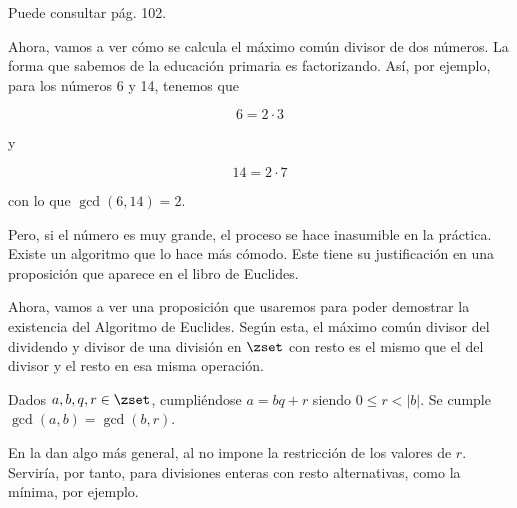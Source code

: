 


Puede consultar \cite{rosen} pág. 102.

Ahora, vamos a ver cómo se calcula el máximo común divisor de dos números.
La forma que sabemos de la educación primaria es factorizando. Así, por
ejemplo, para los números 6 y 14, tenemos que

$$ 6 = 2 \cdot 3 $$

\noindent y

$$ 14 = 2 \cdot 7 $$

\noindent con lo que $\gcd(6, 14) = 2$.

Pero, si el número es muy grande, el proceso se hace inasumible en la
práctica. Existe un algoritmo que lo hace más cómodo. Este tiene su
justificación en una proposición que aparece en el libro  de
Euclides.

Ahora, vamos a ver una proposición que usaremos para poder demostrar la
existencia del Algoritmo de Euclides. Según esta, el máximo común divisor
del dividendo y divisor de una división en $\zset$ con resto es el mismo que
el del divisor y el resto en esa misma operación.

\begin{proposition}\label{th-mcd-div-resto}
  Dados $a, b, q, r \in \zset$, cumpliéndose $a = bq + r$ siendo $0 \leq r <
  |b|$. Se cumple $\gcd(a, b) = \gcd(b, r)$.
\end{proposition}

\iffalse
Sea $g \in \zset$ con $g \geq 0$. Entonces, se cumple $g = \gcd(a, b)$ si y
solo si $g = \gcd(b, r)$.

Dados $a, b \in \zset$, tenemos, por el teorema de la división en $\zset$
con resto, que existen $q, r \in \zset$ únicos con $0 \leq r < |b|$ que
cumplen

$$ a = bq + r $$

\noindent Entonces, se cumple que

$$ \gcd(a, b) = \gcd(b, r) $$
\fi

En \cite{weissman} la dan algo más general, al no impone la
restricción de los valores de $r$. Serviría, por tanto, para divisiones
enteras con resto alternativas, como la mínima, por ejemplo.


